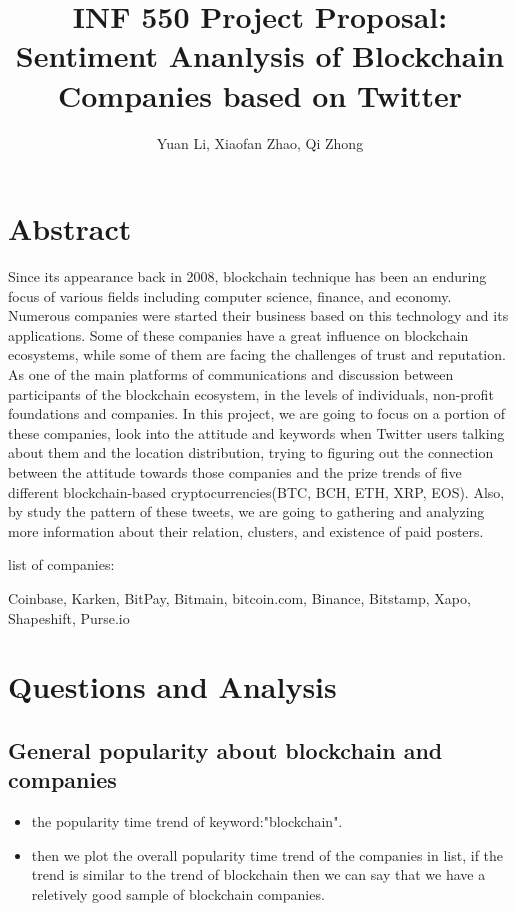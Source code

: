\documentclass{article}
\begin{document}
\title{INF 550 Project Proposal: Sentiment Ananlysis of Blockchain Companies based on Twitter}
\author{Yuan Li, Xiaofan Zhao, Qi Zhong}
\maketitle
\section{Abstract}
Since its appearance back in 2008, blockchain technique has been an enduring focus of various fields including computer science, finance, and economy. Numerous companies were started their business based on this technology and its applications. Some of these companies have a great influence on blockchain ecosystems, while some of them are facing the challenges of trust and reputation. As one of the main platforms of communications and discussion between participants of the blockchain ecosystem, in the levels of individuals, non-profit foundations and companies. In this project, we are going to focus on a portion of these companies, look into the attitude and keywords when Twitter users talking about them and the location distribution, trying to figuring out the connection between the attitude towards those companies and the prize trends of five different blockchain-based cryptocurrencies(BTC, BCH, ETH, XRP, EOS). Also, by study the pattern of these tweets, we are going to gathering and analyzing more information about their relation, clusters, and existence of paid posters.

list of companies: 

Coinbase, Karken, BitPay, Bitmain, bitcoin.com, Binance, Bitstamp, Xapo, Shapeshift, Purse.io
\section{Questions and Analysis}
\subsection{General popularity about blockchain and companies}
\begin{itemize}
\item the popularity time trend of keyword:"blockchain".
\item then we plot the overall popularity time trend of the companies in list, if the trend is similar to the trend of blockchain then we can say that we have a reletively good sample of blockchain companies.
\end{itemize}
\end{document}
